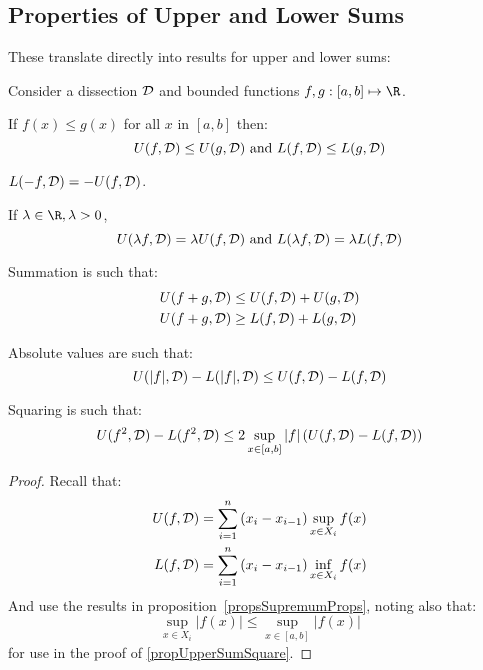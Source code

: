 \documentclass[../Main.tex]{subfiles}
\begin{document}
\subsection{Properties of Upper and Lower Sums}
These translate directly into results for upper and lower sums:
\begin{propositions}{
        Consider a dissection $\mathcal{D}$ and bounded functions $f, g : [a, b] \mapsto \R$.
        \label{propsUpperSumProps}
    }
    \item If $f(x) \leq g(x)$ for all $x$ in $[a, b]$ then:
        \begin{equation*}
            U(f, \mathcal{D}) \leq U(g, \mathcal{D}) \text{ and } L(f, \mathcal{D}) \leq L(g, \mathcal{D})
        \end{equation*}
        \label{propupperSumPreservesOrdering}
    \item $L(-f, \mathcal{D}) = -U(f, \mathcal{D})$. \label{propUpperSumNegative}
    \item If $\lambda \in \R, \lambda > 0$,
        \begin{equation*}
            U(\lambda f, \mathcal{D}) = \lambda U(f, \mathcal{D}) \text{ and } L(\lambda f, \mathcal{D}) = \lambda L(f, \mathcal{D})
        \end{equation*}
        \label{propUpperSumConstant}
    \item Summation is such that:
        \begin{align*}
            U(f + g, \mathcal{D}) &\leq U(f, \mathcal{D}) + U(g, \mathcal{D}) \\
            U(f + g, \mathcal{D}) &\geq L(f, \mathcal{D}) + L(g, \mathcal{D})
        \end{align*}
        \label{propUpperSumSum}
    \item Absolute values are such that:
        \begin{equation*}
            U(|f|, \mathcal{D}) - L(|f|, \mathcal{D}) \leq U(f, \mathcal{D}) - L(f, \mathcal{D})
        \end{equation*}
        \label{propUpperSumAbs}
    \item Squaring is such that:
        \begin{equation*}
            U(f^2, \mathcal{D}) - L(f^2, \mathcal{D}) \leq 2\sup_{x \in [a, b]} |f| \left(U(f, \mathcal{D}) - L(f, \mathcal{D})\right)
        \end{equation*}
        \label{propUpperSumSquare}
\end{propositions}
\begin{proof}
    Recall that:
    \begin{align*}
        U(f, \mathcal{D}) &= \sum_{i = 1}^n \left(x_i - x_{i - 1}\right) \sup_{x \in X_i} f(x) \\
        L(f, \mathcal{D}) &= \sum_{i = 1}^n \left(x_i - x_{i - 1}\right) \inf_{x \in X_i} f(x)
    \end{align*}
    And use the results in proposition~\ref{propsSupremumProps}, noting also that:
    \begin{equation*}
        \sup_{x \in X_i} |f(x)| \leq \sup_{x \in [a, b]} |f(x)|
    \end{equation*}
    for use in the proof of \ref{propUpperSumSquare}.
\end{proof}
\end{document}
